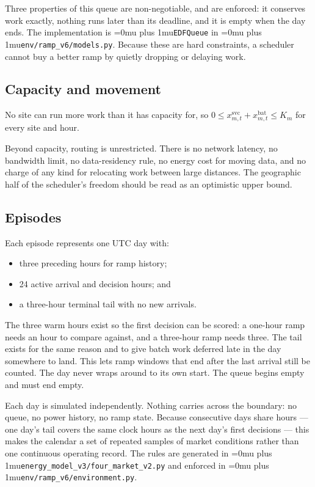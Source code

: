 \documentclass[conference]{IEEEtran}
\newcommand{\codepath}[1]{{\Urlmuskip=0mu plus 1mu\relax\nolinkurl{#1}}}
\begin{document}
Three properties of this queue are non-negotiable, and are enforced: it conserves work exactly, nothing runs later than its deadline, and it is empty when the day ends. The implementation is \codepath{EDFQueue} in \codepath{env/ramp_v6/models.py}. Because these are hard constraints, a scheduler cannot buy a better ramp by quietly dropping or delaying work.

\subsection{Capacity and movement}
\label{subsec:problem-feasibility}

No site can run more work than it has capacity for, so \(0\leq x^{\mathrm{svc}}_{m,t}+x^{\mathrm{bat}}_{m,t}\leq K_m\) for every site and hour.

Beyond capacity, routing is unrestricted. There is no network latency, no bandwidth limit, no data-residency rule, no energy cost for moving data, and no charge of any kind for relocating work between large distances. The geographic half of the scheduler's freedom should be read as an optimistic upper bound.

\subsection{Episodes}
\label{subsec:problem-episode}

Each episode represents one UTC day with:
\begin{itemize}
  \item three preceding hours for ramp history;
  \item 24 active arrival and decision hours; and
  \item a three-hour terminal tail with no new arrivals.
\end{itemize}

The three warm hours exist so the first decision can be scored: a one-hour ramp needs an hour to compare against, and a three-hour ramp needs three. The tail exists for the same reason and to give batch work deferred late in the day somewhere to land. This lets ramp windows that end after the last arrival still be counted. The day never wraps around to its own start. The queue begins empty and must end empty.

Each day is simulated independently. Nothing carries across the boundary: no queue, no power history, no ramp state. Because consecutive days share hours --- one day's tail covers the same clock hours as the next day's first decisions --- this makes the calendar a set of repeated samples of market conditions rather than one continuous operating record. The rules are generated in \codepath{energy_model_v3/four_market_v2.py} and enforced in \codepath{env/ramp_v6/environment.py}.
\end{document}
